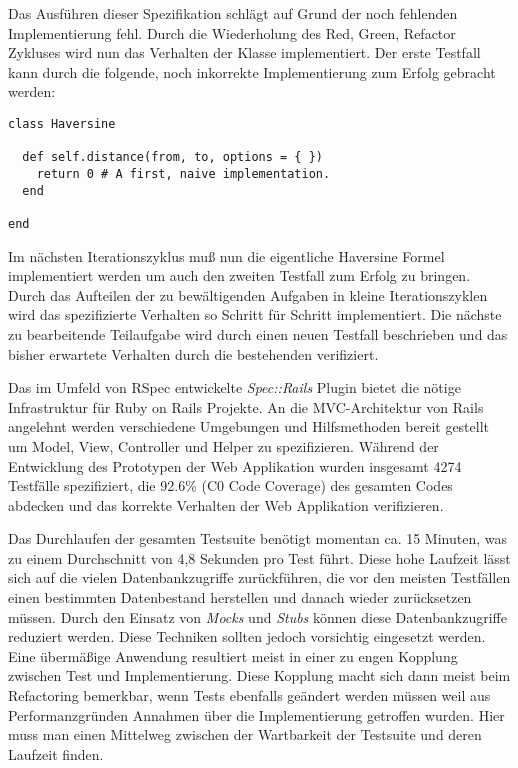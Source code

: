 Das Ausführen dieser Spezifikation schlägt auf Grund der noch
fehlenden Implementierung fehl. Durch die Wiederholung des Red, Green,
Refactor Zykluses wird nun das Verhalten der Klasse implementiert. Der
erste Testfall kann durch die folgende, noch inkorrekte
Implementierung zum Erfolg gebracht werden:

{\footnotesize
\begin{verbatim}
class Haversine

  def self.distance(from, to, options = { })
    return 0 # A first, naive implementation.
  end

end
\end{verbatim}
}

Im nächsten Iterationszyklus muß nun die eigentliche Haversine Formel
\cite{wiki:haversine} implementiert werden um auch den zweiten
Testfall zum Erfolg zu bringen. Durch das Aufteilen der zu
bewältigenden Aufgaben in kleine Iterationszyklen wird das
spezifizierte Verhalten so Schritt für Schritt implementiert. Die
nächste zu bearbeitende Teilaufgabe wird durch einen neuen Testfall
beschrieben und das bisher erwartete Verhalten durch die bestehenden
verifiziert.

Das im Umfeld von RSpec entwickelte \textit{Spec::Rails} Plugin bietet
die nötige Infrastruktur für Ruby on Rails Projekte. An die
MVC-Architektur von Rails angelehnt werden verschiedene Umgebungen und
Hilfsmethoden bereit gestellt um Model, View, Controller und Helper zu
spezifizieren. Während der Entwicklung des Prototypen der Web
Applikation wurden insgesamt 4274 Testfälle spezifiziert, die 92.6\%
(C0 Code Coverage) des gesamten Codes abdecken und das korrekte
Verhalten der Web Applikation verifizieren.

Das Durchlaufen der gesamten Testsuite benötigt momentan ca. 15
Minuten, was zu einem Durchschnitt von 4,8 Sekunden pro Test
führt. Diese hohe Laufzeit lässt sich auf die vielen Datenbankzugriffe
zurückführen, die vor den meisten Testfällen einen bestimmten
Datenbestand herstellen und danach wieder zurücksetzen müssen. Durch
den Einsatz von \textit{Mocks} und \textit{Stubs} können diese
Datenbankzugriffe reduziert werden. Diese Techniken sollten jedoch
vorsichtig eingesetzt werden. Eine übermäßige Anwendung resultiert
meist in einer zu engen Kopplung zwischen Test und
Implementierung. Diese Kopplung macht sich dann meist beim Refactoring
bemerkbar, wenn Tests ebenfalls geändert werden müssen weil aus
Performanzgründen Annahmen über die Implementierung getroffen
wurden. Hier muss man einen Mittelweg zwischen der Wartbarkeit der
Testsuite und deren Laufzeit finden.

